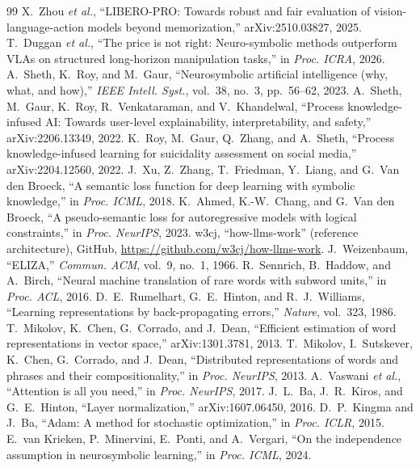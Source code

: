 \documentclass[letterpaper, 10pt, conference]{IEEEtran}
\begin{document}
\begin{thebibliography}{99}
\scriptsize
\setlength{\itemsep}{0pt}
 X.~Zhou \emph{et al.}, ``LIBERO-PRO: Towards robust and fair evaluation of vision-language-action models beyond memorization,'' arXiv:2510.03827, 2025.
 T.~Duggan \emph{et al.}, ``The price is not right: Neuro-symbolic methods outperform VLAs on structured long-horizon manipulation tasks,'' in \emph{Proc. ICRA}, 2026.
 A.~Sheth, K.~Roy, and M.~Gaur, ``Neurosymbolic artificial intelligence (why, what, and how),'' \emph{IEEE Intell. Syst.}, vol.~38, no.~3, pp.~56--62, 2023.
 A.~Sheth, M.~Gaur, K.~Roy, R.~Venkataraman, and V.~Khandelwal, ``Process knowledge-infused AI: Towards user-level explainability, interpretability, and safety,'' arXiv:2206.13349, 2022.
 K.~Roy, M.~Gaur, Q.~Zhang, and A.~Sheth, ``Process knowledge-infused learning for suicidality assessment on social media,'' arXiv:2204.12560, 2022.
 J.~Xu, Z.~Zhang, T.~Friedman, Y.~Liang, and G.~Van den Broeck, ``A semantic loss function for deep learning with symbolic knowledge,'' in \emph{Proc. ICML}, 2018.
 K.~Ahmed, K.-W.~Chang, and G.~Van den Broeck, ``A pseudo-semantic loss for autoregressive models with logical constraints,'' in \emph{Proc. NeurIPS}, 2023.
 w3cj, ``how-llms-work'' (reference architecture), GitHub, \url{https://github.com/w3cj/how-llms-work}.
 J.~Weizenbaum, ``ELIZA,'' \emph{Commun. ACM}, vol.~9, no.~1, 1966.
 R.~Sennrich, B.~Haddow, and A.~Birch, ``Neural machine translation of rare words with subword units,'' in \emph{Proc. ACL}, 2016.
 D.~E.~Rumelhart, G.~E.~Hinton, and R.~J.~Williams, ``Learning representations by back-propagating errors,'' \emph{Nature}, vol.~323, 1986.
 T.~Mikolov, K.~Chen, G.~Corrado, and J.~Dean, ``Efficient estimation of word representations in vector space,'' arXiv:1301.3781, 2013.
 T.~Mikolov, I.~Sutskever, K.~Chen, G.~Corrado, and J.~Dean, ``Distributed representations of words and phrases and their compositionality,'' in \emph{Proc. NeurIPS}, 2013.
 A.~Vaswani \emph{et al.}, ``Attention is all you need,'' in \emph{Proc. NeurIPS}, 2017.
 J.~L.~Ba, J.~R.~Kiros, and G.~E.~Hinton, ``Layer normalization,'' arXiv:1607.06450, 2016.
 D.~P.~Kingma and J.~Ba, ``Adam: A method for stochastic optimization,'' in \emph{Proc. ICLR}, 2015.
 E.~van Krieken, P.~Minervini, E.~Ponti, and A.~Vergari, ``On the independence assumption in neurosymbolic learning,'' in \emph{Proc. ICML}, 2024.

\end{thebibliography}
\end{document}
